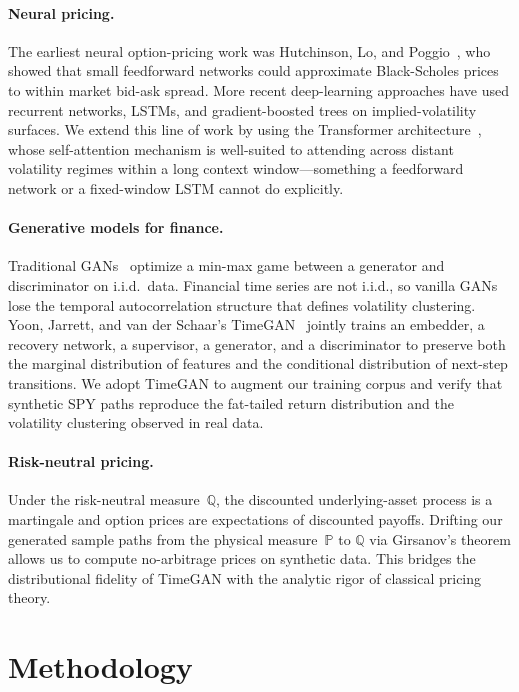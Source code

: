 \documentclass[conference]{IEEEtran}
\begin{document}
\paragraph*{Neural pricing.}
The earliest neural option-pricing work was
Hutchinson, Lo, and Poggio~\cite{hutchinson1994nonparametric},
who showed that small feedforward networks could approximate
Black-Scholes prices to within market bid-ask spread. More
recent deep-learning approaches have used recurrent networks,
LSTMs, and gradient-boosted trees on implied-volatility
surfaces. We extend this line of work by using the Transformer
architecture~\cite{vaswani2017attention}, whose self-attention
mechanism is well-suited to attending across distant volatility
regimes within a long context window---something a feedforward
network or a fixed-window LSTM cannot do explicitly.

\paragraph*{Generative models for finance.}
Traditional GANs~\cite{goodfellow2014gan} optimize a min-max
game between a generator and discriminator on i.i.d.\ data.
Financial time series are not i.i.d., so vanilla GANs lose the
temporal autocorrelation structure that defines volatility
clustering. Yoon, Jarrett, and van der Schaar's
TimeGAN~\cite{yoon2019timegan} jointly trains an embedder, a
recovery network, a supervisor, a generator, and a discriminator
to preserve both the marginal distribution of features and the
conditional distribution of next-step transitions. We adopt
TimeGAN to augment our training corpus and verify that synthetic
SPY paths reproduce the fat-tailed return distribution and the
volatility clustering observed in real data.

\paragraph*{Risk-neutral pricing.}
Under the risk-neutral measure~$\mathbb{Q}$, the discounted
underlying-asset process is a martingale and option prices are
expectations of discounted payoffs. Drifting our generated
sample paths from the physical measure~$\mathbb{P}$ to
$\mathbb{Q}$ via Girsanov's theorem allows us to compute
no-arbitrage prices on synthetic data. This bridges the
distributional fidelity of TimeGAN with the analytic rigor of
classical pricing theory.

\section{Methodology}
\end{document}
